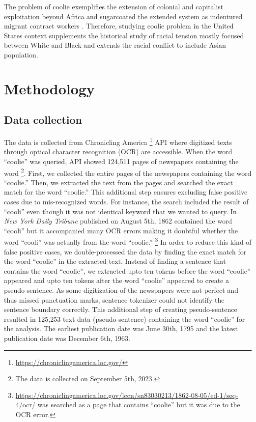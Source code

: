 \documentclass[11pt]{article}
\begin{document}
The problem of coolie exemplifies the extension of colonial and 
capitalist exploitation beyond Africa and sugarcoated 
the extended system as indentured migrant contract workers \cite{van2016coolie}.
Therefore, studying coolie problem in the United States context supplements the historical
study of racial tension mostly focused between White and Black and extends the racial conflict
to include Asian population.  

\section{Methodology} \label{sec:methodology}

\subsection{Data collection} \label{sec:data_collection}
The data is collected from Chronicling America \footnote{\url{https://chroniclingamerica.loc.gov/}} API
where digitized texts through optical character recognition (OCR) are accessible.
When the word ``coolie'' was queried, API showed 124,511 pages of newspapers containing the word \footnote{The data is collected on September 5th, 2023.}.
First, we collected the entire pages of the newspapers containing the word ``coolie.''
Then, we extracted the text from the pages and searched the exact match for the word ``coolie.'' 
This additional step ensures excluding false positive cases due to mis-recognized words.
For instance, the search included the result of ``cooli'' even though it was not identical keyword that we wanted to query.
In \textit{New York Daily Tribune} published on August 5th, 1862 contained the word ``cooli'' but it accompanied
many OCR errors making it doubtful whether the word ``cooli'' was actually from the word ``coolie.'' 
\footnote{\url{https://chroniclingamerica.loc.gov/lccn/sn83030213/1862-08-05/ed-1/seq-4/ocr/} was searched as a page that contains ``coolie''
but it was due to the OCR error.}
In order to reduce this kind of false positive cases, we double-processed the data by finding the exact match
for the word ``coolie'' in the extracted text.
Instead of finding a sentence that contains the word ``coolie'', we extracted upto ten tokens before the word ``coolie'' appeared
and upto ten tokens after the word ``coolie'' appeared to create a pseudo-sentence.
As some digitization of the newspapers were not perfect and thus missed punctuation marks, sentence tokenizer could not
identify the sentence boundary correctly.
This additional step of creating pseudo-sentence resulted in 125,253 text data (pseudo-sentence) containing the word ``coolie'' for the analysis.
The earliest publication date was June 30th, 1795 and the latest publication date was December 6th, 1963.
\end{document}

